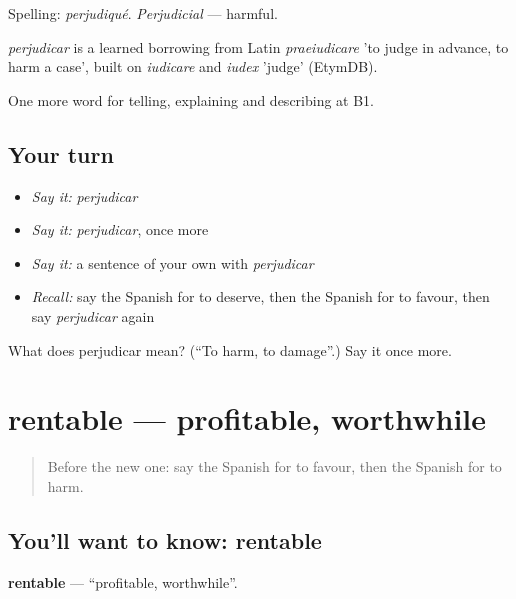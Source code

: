Spelling: \emph{perjudiqué}. \emph{Perjudicial} — harmful.

\begin{cousinweb}
\emph{perjudicar} is a learned borrowing from Latin \emph{praeiudicare} 'to judge in advance, to harm a case', built on \emph{iudicare} and \emph{iudex} 'judge' (EtymDB).
\end{cousinweb}

\begin{grammarlens}[title={What you've built}]
One more word for telling, explaining and describing at B1.
\end{grammarlens}

\subsection*{Your turn}
\begin{itemize}
\raggedright
  \item \emph{Say it:} \emph{perjudicar}
  \item \emph{Say it:} \emph{perjudicar}, once more
  \item \emph{Say it:} a sentence of your own with \emph{perjudicar}
  \item \emph{Recall:} say the Spanish for to deserve, then the Spanish for to favour, then say \emph{perjudicar} again
\end{itemize}

\begin{tcolorbox}[breakable,colback=teal!4,colframe=teal!35!black,title={Before you move on}]
What does perjudicar mean? (\textquotedblleft{}To harm, to damage\textquotedblright{}.) Say it once more.
\end{tcolorbox}
\section[rentable]{rentable — profitable, worthwhile}

\label{lesson:ES-C637-rentable}



\begin{quote}
Before the new one: say the Spanish for to favour, then the Spanish for to harm.
\end{quote}

\subsection*{You'll want to know: rentable}
\textbf{rentable} — \textquotedblleft{}profitable, worthwhile\textquotedblright{}.

